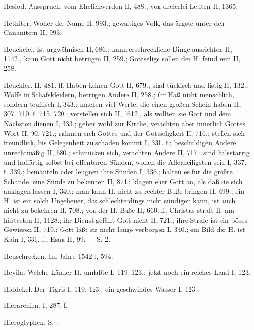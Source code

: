 Hesiod. Ausspruch: vom Ehelichwerden II, 488., von dreierlei Leuten II, 1365.

Hethiter. Woher der Name II, 993.; gewaltiges Volk, das ärgste unter den Cananitern II, 993.

Heuchelei. Ist argwöhnisch II, 686.; kann erschreckliche Dinge ausrichten II, 1142., kann Gott nicht betrügen II, 259.; Gottselige sollen der H. feind sein II, 258.

Heuchler. II, 481. ff. Haben keinen Gott II, 679.; sind tückisch und listig II, 132., Wölfe in Schafskleidern, betrügen Andere II, 258.; ihr Haß nicht menschlich, sondern teuflisch I, 343.; machen viel Worte, die einen großen Schein haben II, 307. 710. f. 715. 720.; verstellen sich II, 1612., als wollten sie Gott und dem Nächsten dienen I, 333.; gehen wohl zur Kirche, verachten aber innerlich Gottes Wort II, 90. 721.; rühmen sich Gottes und der Gottseligkeit II, 716.; stellen sich freundlich, bis Gelegenheit zu schaden kommt I, 331. f.; beschuldigen Andere unrechtmäßig II, 680.; schmücken sich, verachten Andere II, 717.; sind halsstarrig und hoffärtig selbst bei offenbaren Sünden, wollen die Allerheiligsten sein I, 337. f. 339.; bemänteln oder leugnen ihre Sünden I, 336.; halten es für die größte Schande, eine Sünde zu bekennen II, 871.; klagen eher Gott an, als daß sie sich anklagen lassen I, 340.; man kann H. nicht zu rechter Buße bringen II, 699.; ein H. ist ein solch Ungeheuer, das schlechterdings nicht sündigen kann, ist auch nicht zu bekehren II, 708.; von der H. Buße II, 660. ff. Christus straft H. am härtesten II, 1128.; ihr Dienst gefällt Gott nicht II, 721.; ihre Strafe ist ein böses Gewissen II, 719.; Gott läßt sie nicht lange verborgen I, 340.; ein Bild der H. ist Kain I, 331. f., Esau II, 99. — S.  2.

Heuschrecken. Im Jahre 1542 I, 594.

Hevila. Welche Länder H. umfaßte I, 119. 123.; jetzt noch ein reiches Land I, 123.

Hiddekel. Der Tigris I, 119. 123.; ein geschwindes Wasser I, 123.

Hierarchien. I, 287. f.

Hieroglyphen. S. .

